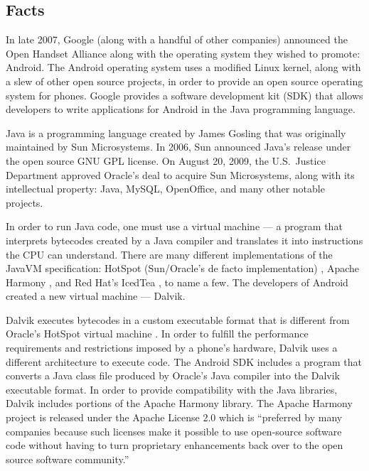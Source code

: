 \documentclass[11pt]{article}
\begin{document}
\newpage

\begin{multicols}{2}
\setcounter{page}{1}

\section{Facts} %
\label{sec:facts}

In late 2007, Google (along with a handful of other companies) announced the
Open Handset Alliance \cite{open-handset-alliance-ann} along with the operating
system they wished to promote: Android.  The Android operating system uses a
modified Linux kernel, along with a slew of other open source projects, in
order to provide an open source operating system for phones.  Google provides a
software development kit (SDK) that allows developers to write applications for
Android in the Java programming language.

Java is a programming language created by James Gosling that was originally
maintained by Sun Microsystems.  In 2006, Sun announced Java's release under the
open source GNU GPL license. \cite{sun-open-sources-java} On August 20, 2009,
the U.S.~Justice Department approved Oracle's deal to acquire Sun Microsystems,
along with its intellectual property: Java, MySQL, OpenOffice, and many other
notable projects. \cite{oracle-buys-sun}

In order to run Java code, one must use a virtual machine --- a program that
interprets bytecodes created by a Java compiler and translates it into
instructions the CPU can understand. \cite{javavm-bytecode} There are many
different implementations of the JavaVM specification: HotSpot (Sun/Oracle's de
facto implementation) \cite{hotspot}, Apache Harmony \cite{apache-harmony}, and
Red Hat's IcedTea \cite{icedtea}, to name a few.  The developers of Android
created a new virtual machine --- Dalvik.

Dalvik executes bytecodes in a custom executable format \cite{dalvik-bytecode}
that is different from Oracle's HotSpot virtual machine \cite{javavm-bytecode}.
In order to fulfill the performance requirements and restrictions imposed by a
phone's hardware, Dalvik uses a different architecture to execute code.  The
Android SDK includes a program that converts a Java class file produced by
Oracle's Java compiler into the Dalvik executable format.
\cite{android-sdk-building}  In order to provide compatibility with the Java
libraries, Dalvik includes portions of the Apache Harmony library.
\cite{apache-harmony} \cite{dalvik-readme}  The Apache Harmony project is
released under the Apache License 2.0 \cite{apache-license} which is ``preferred
by many companies because such licenses make it possible to use open-source
software code without having to turn proprietary enhancements back over to the
open source software community.'' \cite{why-apache2-license}


\end{multicols}
\end{document}
